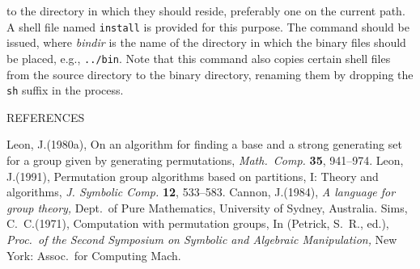to the directory in which they should reside, preferably one on the current
path.  A shell file named {\tt install} is provided for this purpose.
The command
\vskip2pt
\hskip0.45in
\vskip2pt
should be issued, where {\it bindir\/} is the name of the directory in
which the binary files should be placed, e.g., {\tt ../bin}.  Note that
this command also copies certain shell files from the source directory
to the binary directory, renaming them by dropping the {\tt sh} suffix
in the process.
%
\bigbreak
\vskip15pt
\centerline{\sectionheaderfont REFERENCES}
\nobreak\medskip\nobreak
Leon, J.\enskip (1980a),\enskip
On an algorithm for finding a base and a strong generating set
for a group given by generating permutations,\enskip
{\it Math.\ Comp.}
{\bf 35},
941--974.
\medbreak
Leon, J.\enskip(1991),\enskip
Permutation group algorithms based on partitions, I: Theory and algorithms,\enskip
{\it J. Symbolic Comp.}
{\bf 12},
533--583.
\medbreak
Cannon, J.\enskip (1984),\enskip
{\it A language for group theory,}\enskip
Dept.\ of Pure Mathematics, University of Sydney, Australia.
\medbreak
Sims, C.~C.\enskip (1971),\enskip
Computation with permutation groups,\enskip
In (Petrick, S.~R., ed.),\enskip
{\it Proc.\ of the Second Symposium on Symbolic and
Algebraic Manipulation,}\enskip
New York: Assoc.\ for Computing Mach.
\bye
